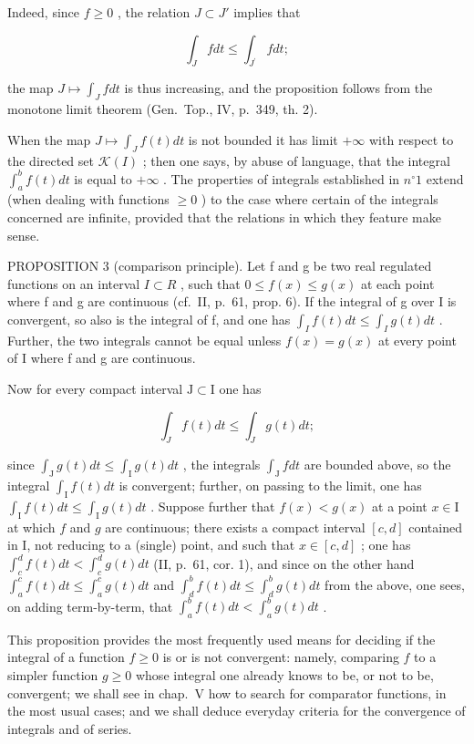 Indeed, since \(f \geqslant 0\) , the relation \(J \subset J'\) implies that

\[
\int_ {J} f d t \leqslant \int_ {J ^ {\prime}} f d t;
\]

the map \(J \mapsto \int_{J} f dt\) is thus increasing, and the proposition follows from the monotone limit theorem (Gen.~Top., IV, p.~349, th. 2).

When the map \(J \mapsto \int_{J} f(t) dt\) is not bounded it has limit \(+\infty\) with respect to the directed set \(\mathcal{K}(I)\) ; then one says, by abuse of language, that the integral \(\int_{a}^{b} f(t) dt\) is equal to \(+\infty\) . The properties of integrals established in \(n^{\circ} 1\) extend (when dealing with functions \(\geqslant 0\) ) to the case where certain of the integrals concerned are infinite, provided that the relations in which they feature make sense.

PROPOSITION 3 (comparison principle). Let f and g be two real regulated functions on an interval \(I \subset R\) , such that \(0 \leqslant f(x) \leqslant g(x)\) at each point where f and g are continuous (cf.~II, p.~61, prop. 6). If the integral of g over I is convergent, so also is the integral of f, and one has \(\int_{I} f(t) dt \leqslant \int_{I} g(t) dt\) . Further, the two integrals cannot be equal unless \(f(x) = g(x)\) at every point of I where f and g are continuous.

Now for every compact interval \(\mathrm{J} \subset \mathrm{I}\) one has

\[
\int_ {J} f (t) d t \leqslant \int_ {J} g (t) d t;
\]

since \(\int_{\mathrm{J}} g(t) dt \leqslant \int_{\mathrm{I}} g(t) dt\) , the integrals \(\int_{\mathrm{J}} f dt\) are bounded above, so the integral \(\int_{\mathrm{I}} f(t) dt\) is convergent; further, on passing to the limit, one has \(\int_{\mathrm{I}} f(t) dt \leqslant \int_{\mathrm{I}} g(t) dt\) . Suppose further that \(f(x) < g(x)\) at a point \(x \in \mathrm{I}\) at which \(f\) and \(g\) are continuous; there exists a compact interval \([c, d]\) contained in I, not reducing to a (single) point, and such that \(x \in [c, d]\) ; one has \(\int_{c}^{d} f(t) dt < \int_{c}^{d} g(t) dt\) (II, p.~61, cor. 1), and since on the other hand \(\int_{a}^{c} f(t) dt \leqslant \int_{a}^{c} g(t) dt\) and \(\int_{d}^{b} f(t) dt \leqslant \int_{d}^{b} g(t) dt\) from the above, one sees, on adding term-by-term, that \(\int_{a}^{b} f(t) dt < \int_{a}^{b} g(t) dt\) .

This proposition provides the most frequently used means for deciding if the integral of a function \(f \geqslant 0\) is or is not convergent: namely, comparing \(f\) to a simpler function \(g \geqslant 0\) whose integral one already knows to be, or not to be, convergent; we shall see in chap.~V how to search for comparator functions, in the most usual cases; and we shall deduce everyday criteria for the convergence of integrals and of series.

